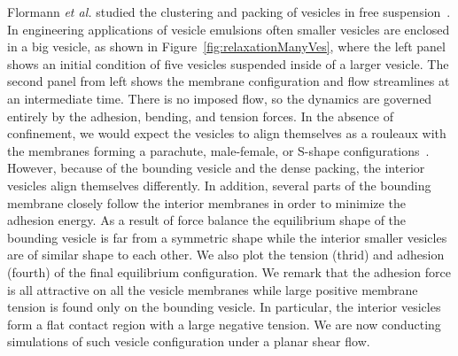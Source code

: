 \documentclass[prf,superscriptaddress,showpacs]{revtex4-1}
\begin{document}
Flormann {\it et al.} studied the clustering and packing of vesicles in free suspension~\cite{FlormannAouane2017_SciReports}. 
In engineering applications of vesicle emulsions
often smaller vesicles are enclosed in a big vesicle, as shown in 
Figure~\ref{fig:relaxationManyVes}, where  the left panel shows an initial condition of five vesicles
suspended inside of a larger vesicle.
The second panel from left shows the membrane configuration and flow
streamlines at an intermediate time.  There is no imposed flow, so the
dynamics are governed entirely by the adhesion, bending, and tension
forces.  In the absence of confinement, we would expect the vesicles to
align themselves as a rouleaux with the membranes forming a parachute,
male-female, or S-shape
configurations~\cite{FlormannAouane2017_SciReports}.  However, because
of the bounding vesicle and the dense packing, the interior vesicles
align themselves differently.  In addition, several parts of the
bounding membrane closely follow the interior membranes in order to
minimize the adhesion energy.   As a result of force balance the equilibrium shape of the bounding vesicle
is far from a symmetric shape while the interior smaller vesicles are of similar shape to each other.
We also plot the tension (thrid) and
adhesion (fourth) of the final equilibrium configuration.  
We remark that the adhesion force is all attractive on all the vesicle membranes while large positive
membrane tension is found only on the bounding vesicle. 
In particular, the interior vesicles form a flat
contact region with a large negative tension.
We are now conducting simulations of such vesicle configuration under a planar shear flow.

\end{document}
